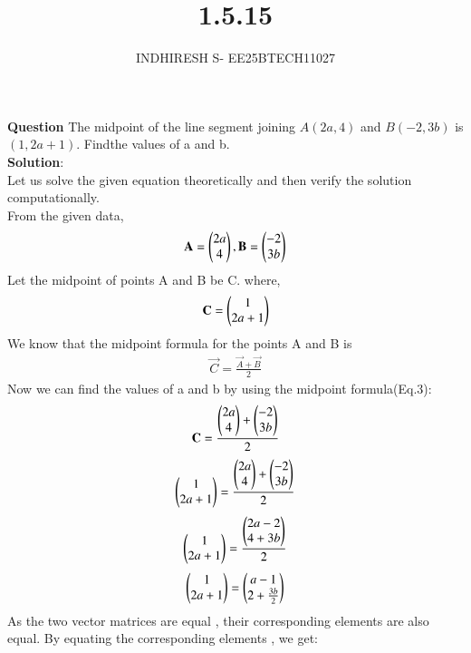 \documentclass[journal]{IEEEtran}
\theoremstyle{remark}
\begin{document}

\onecolumn

\title{1.5.15}
\author{INDHIRESH S- EE25BTECH11027}
\maketitle


\renewcommand{\thefigure}{\theenumi}
\renewcommand{\thetable}{\theenumi}

\textbf{Question} The midpoint of the line segment joining $A(2a, 4)$ and $B(-2, 3b)$ is $(1, 2a + 1)$. Findthe values of a and b.\\
\textbf{Solution}:\\
Let us solve the given equation theoretically and then verify the solution computationally. \\
From the given data,
\begin{align}
\mathbf{A}= \begin{pmatrix}2a\\4\end{pmatrix} , \mathbf{B}=\begin{pmatrix}-2\\3b\end{pmatrix}
\end{align}
Let the midpoint of points A and B be C. where,
\begin{align}
    \mathbf{C}=\begin{pmatrix}1\\2a+1\end{pmatrix}
\end{align}
We know that the midpoint formula for the points A and B is
\begin{align}
    \vec{C}=\frac{\vec{A}+\vec{B}}{2}
\end{align}
Now we can find the values of a and b by using the midpoint formula(Eq.3):
\begin{align}
    \mathbf{C}=\frac{\begin{pmatrix}2a\\4\end{pmatrix} +\begin{pmatrix}-2\\3b\end{pmatrix}}{2}
\end{align}
\begin{align}
    \begin{pmatrix}1\\2a+1\end{pmatrix}=\frac{\begin{pmatrix}2a\\4\end{pmatrix} +\begin{pmatrix}-2\\3b\end{pmatrix}}{2}
\end{align}
\begin{align}
    \begin{pmatrix}1\\2a+1\end{pmatrix}=\frac{\begin{pmatrix}2a-2\\4+3b\end{pmatrix}}{2}
\end{align}
\begin{align}
    \begin{pmatrix}1\\2a+1\end{pmatrix}=\begin{pmatrix}a-1\\2+\frac{3b}{2}\end{pmatrix}
\end{align}
As the two vector matrices are equal , their corresponding elements are also equal. By equating the corresponding elements , we get:
\end{document}
